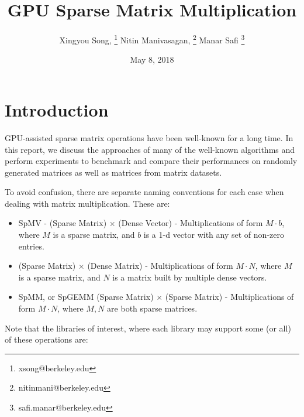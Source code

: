 \documentclass[12pt]{article}
\begin{document}
\nocite{*} 
 

\title{GPU Sparse Matrix Multiplication}
\author{Xingyou Song, \footnote{xsong@berkeley.edu} Nitin Manivasagan, \footnote{nitinmani@berkeley.edu} Manar Safi \footnote{safi.manar@berkeley.edu}}
\date{May 8, 2018} 
\maketitle

\section{Introduction}

\hspace{0.5cm}GPU-assisted sparse matrix operations have been well-known for a long time. In this report, we discuss the approaches of many of the well-known algorithms and perform experiments to benchmark and compare their performances on randomly generated matrices as well as matrices from matrix datasets.

To avoid confusion, there are separate naming conventions for each case when dealing with matrix multiplication. These are: 
\begin{itemize}
\item SpMV - (Sparse Matrix) $\times$ (Dense Vector) - Multiplications of form $M \cdot b$, where $M$ is a sparse matrix, and $b$ is a 1-d vector with any set of non-zero entries.
\item (Sparse Matrix) $\times$ (Dense Matrix) - Multiplications of form $M \cdot N$, where $M$ is a sparse matrix, and $N$ is a matrix built by multiple dense vectors. 
\item SpMM, or SpGEMM (Sparse Matrix) $\times$ (Sparse Matrix) - Multiplications of form $M \cdot N$, where $M,N$ are both sparse matrices. 
\end{itemize}

Note that the libraries of interest, where each library may support some (or all) of these operations are:
\end{document}
